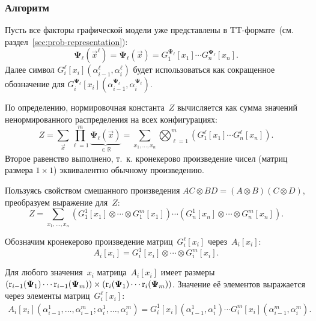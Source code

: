 \subsubsection{Алгоритм}
Пусть все факторы графической модели уже представлены в TT\hyp{}формате~(см. раздел~\ref{sec:prob-representation}):
\begin{equation}
\mathbf{\Psi}_{\ell}(\vec{x}^{\ell}) = \mathbf{\Psi}_{\ell}(\vec{x}) = G^{\mathbf{\Psi}_{\ell}}_1[x_1] \dotsm G^{\mathbf{\Psi}_{\ell}}_n[x_n].
\end{equation}
Далее символ $G^{\ell}_i[x_i](\alpha^{\ell}_{i - 1}, \alpha^{\ell}_i)$ будет использоваться как сокращенное обозначение для $G^{\mathbf{\Psi}_{\ell}}_i[x_i](\alpha^{\mathbf{\Psi}_{\ell}}_{i - 1}, \alpha^{\mathbf{\Psi}_{\ell}}_i)$.

По определению, нормировочная константа~$Z$ вычисляется как сумма значений ненормированного распределения на всех конфигурациях:
\begin{equation*}
Z = \sum_{\vec{x}} \prod_{\ell = 1}^{m} \underbrace{\mathbf{\Psi}_{\ell}(\vec{x})}_{\text{$\in \mathbb{R}$}}
= \!\!\sum_{x_1, \dots, x_n} \bigotimes_{\ell = 1}^{m} \left (G^{\ell}_1[x_1] \dotsm G^{\ell}_n[x_n]  \right).
\end{equation*}
Второе равенство выполнено, т.~к. кронекерово произведение чисел (матриц размера $1 \times 1$) эквивалентно обычному произведению.


Пользуясь свойством смешанного произведения $AC \otimes BD = (A\otimes B)(C \otimes D)$, преобразуем выражение для~$Z$:
\begin{equation*}
Z =
\sum_{x_1, \dots, x_n} \left ( G^1_1[x_1] \otimes \dotsb \otimes G^m_1[x_1] \right ) \dotsm
\left ( G^1_n[x_n] \otimes \dotsb \otimes G^m_n[x_n] \right ).
\end{equation*}

Обозначим кронекерово произведение матриц~$G^\ell_i[x_i]$ через~$A_i[x_i]$:
\begin{equation*}
A_i[x_i] = G^1_i[x_i] \otimes \dotsb \otimes G^m_i[x_i].
\end{equation*}

Для любого значения~$x_i$ матрица~$A_i[x_i]$ имеет размеры $(\operatorname{r}_{i - 1}(\mathbf{\Psi}_1)  \dotsm  \operatorname{r}_{i - 1}(\mathbf{\Psi}_m)) \times (\operatorname{r}_{i}(\mathbf{\Psi}_1)  \dotsm  \operatorname{r}_{i}(\mathbf{\Psi}_m))$. Значение её элементов выражается через элементы матриц~$G_i^{\ell}[x_i]$:
\begin{multline*}
A_i[x_i](\alpha^1_{i - 1}, \dots, \alpha^m_{i - 1}; \alpha^1_i, \dots, \alpha^m_i) = G^1_i[x_i](\alpha^1_{i - 1}, \alpha^1_i)  \dotsm  G^m_i[x_i](\alpha^m_{i - 1}, \alpha^m_i).
\end{multline*}

